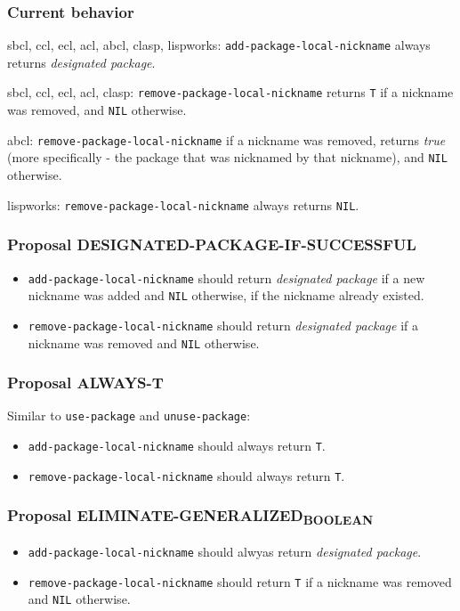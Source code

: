 \documentclass[11pt]{article}
\begin{document}
\subsubsection{Current behavior}
\label{sec:org1a1c99c}
sbcl, ccl, ecl, acl, abcl, clasp, lispworks:
  \texttt{add-package-local-nickname} always returns \emph{designated package}.

sbcl, ccl, ecl, acl, clasp:
  \texttt{remove-package-local-nickname} returns \texttt{T} if a nickname was removed,
  and \texttt{NIL} otherwise.

abcl:
  \texttt{remove-package-local-nickname} if a nickname was removed, returns \emph{true} (more
  specifically - the package that was nicknamed by that nickname), and \texttt{NIL}
  otherwise.

lispworks:
  \texttt{remove-package-local-nickname} always returns \texttt{NIL}.
\subsubsection{Proposal DESIGNATED-PACKAGE-IF-SUCCESSFUL}
\label{sec:org80fc760}
\begin{itemize}
\item \texttt{add-package-local-nickname} should return \emph{designated package} if a new nickname
was added and \texttt{NIL} otherwise, if the nickname already existed.
\item \texttt{remove-package-local-nickname} should return \emph{designated package} if a nickname
was removed and \texttt{NIL} otherwise.
\end{itemize}
\subsubsection{Proposal ALWAYS-T}
\label{sec:org6999275}
Similar to \texttt{use-package} and \texttt{unuse-package}:
\begin{itemize}
\item \texttt{add-package-local-nickname} should always return \texttt{T}.
\item \texttt{remove-package-local-nickname} should always return \texttt{T}.
\end{itemize}
\subsubsection{Proposal ELIMINATE-GENERALIZED\textsubscript{BOOLEAN}}
\label{sec:org59d96de}
\begin{itemize}
\item \texttt{add-package-local-nickname} should alwyas return \emph{designated package}.
\item \texttt{remove-package-local-nickname} should return \texttt{T} if a nickname was removed and
\texttt{NIL} otherwise.
\end{itemize}
\end{document}
